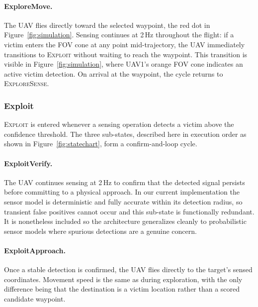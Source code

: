 \documentclass[10pt,a4paper,twocolumn]{article}
\begin{document}
\paragraph{ExploreMove.}
The UAV flies directly toward the selected waypoint, the red dot in Figure~\ref{fig:simulation}. Sensing continues at 2\,Hz throughout the flight: if a victim enters the FOV cone at any point mid-trajectory, the UAV immediately transitions to \textsc{Exploit} without waiting to reach the waypoint. This transition is visible in Figure~\ref{fig:simulation}, where UAV1's orange FOV cone indicates an active victim detection. On arrival at the waypoint, the cycle returns to \textsc{ExploreSense}.

\subsubsection{Exploit}

\textsc{Exploit} is entered whenever a sensing operation detects a victim above the confidence threshold. The three sub-states, described here in execution order as shown in Figure~\ref{fig:statechart}, form a confirm-and-loop cycle.

\paragraph{ExploitVerify.}
The UAV continues sensing at 2\,Hz to confirm that the detected signal persists before committing to a physical approach. In our current implementation the sensor model is deterministic and fully accurate within its detection radius, so transient false positives cannot occur and this sub-state is functionally redundant. It is nonetheless included so the architecture generalizes cleanly to probabilistic sensor models where spurious detections are a genuine concern.

\paragraph{ExploitApproach.}
Once a stable detection is confirmed, the UAV flies directly to the target's sensed coordinates. Movement speed is the same as during exploration, with the only difference being that the destination is a victim location rather than a scored candidate waypoint.
\end{document}

